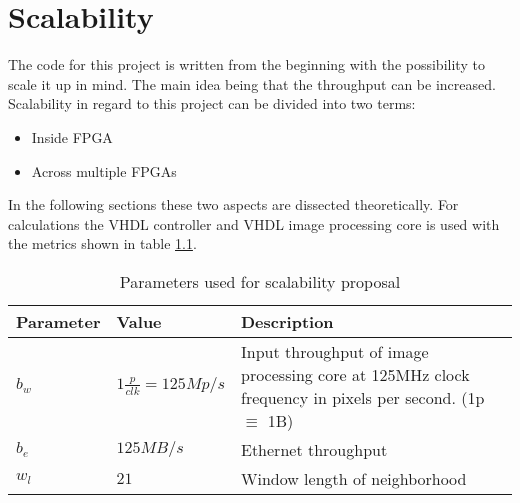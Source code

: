 %
%
\chapter{Scalability} \label{chapt:scalability}
The code for this project is written from the beginning with the possibility to
scale it up in mind. The main idea being that the throughput can be increased.
Scalability in regard to this project can be divided into two terms:
\begin{itemize}
    \item Inside FPGA
    \item Across multiple FPGAs
\end{itemize}

In the following sections these two aspects are dissected theoretically. For
calculations the VHDL controller and VHDL image processing core is used with the
 metrics shown in table \ref{tab:sca:vhdlparams}.

\begin{table}[h!]
    \centering
    \begin{tabular}{l l p{10cm}}
        \toprule
        Parameter & Value & Description \\
        \midrule
        $b_w$  & $1 \frac{p}{clk} = 125 Mp/s$ & Input throughput of image
        processing core at 125MHz clock frequency in pixels per second. (1p
        $\equiv$ 1B) \\
        $b_e$  & $125MB/s$ & Ethernet throughput \\
        $w_l$  & $21$ & Window length of neighborhood \\
        \bottomrule
    \end{tabular}
    \caption{Parameters used for scalability proposal}
    \label{tab:sca:vhdlparams}
\end{table}

